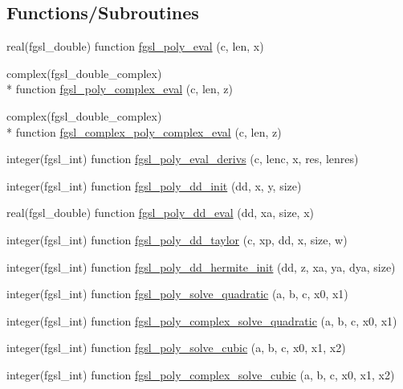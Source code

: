 \subsection*{Functions/\-Subroutines}
\begin{DoxyCompactItemize}
\item 
real(fgsl\-\_\-double) function \hyperlink{poly_8finc_a32cfccd5af1c4b4ce6a1388b521a0e39}{fgsl\-\_\-poly\-\_\-eval} (c, len, x)
\item 
complex(fgsl\-\_\-double\-\_\-complex) \\*
function \hyperlink{poly_8finc_a1e0f019e7c97edb4e583364364479259}{fgsl\-\_\-poly\-\_\-complex\-\_\-eval} (c, len, z)
\item 
complex(fgsl\-\_\-double\-\_\-complex) \\*
function \hyperlink{poly_8finc_a5b484057f9e034d5b22a61812027ef71}{fgsl\-\_\-complex\-\_\-poly\-\_\-complex\-\_\-eval} (c, len, z)
\item 
integer(fgsl\-\_\-int) function \hyperlink{poly_8finc_aab1c2603aacb50d82b93adcd88cbb307}{fgsl\-\_\-poly\-\_\-eval\-\_\-derivs} (c, lenc, x, res, lenres)
\item 
integer(fgsl\-\_\-int) function \hyperlink{poly_8finc_a76d3df1330a37af57601ec4480061f52}{fgsl\-\_\-poly\-\_\-dd\-\_\-init} (dd, x, y, size)
\item 
real(fgsl\-\_\-double) function \hyperlink{poly_8finc_ab036239b25d0a9bd95ac747d71c48b8b}{fgsl\-\_\-poly\-\_\-dd\-\_\-eval} (dd, xa, size, x)
\item 
integer(fgsl\-\_\-int) function \hyperlink{poly_8finc_ab629459414b3347907c9a0559b75bf64}{fgsl\-\_\-poly\-\_\-dd\-\_\-taylor} (c, xp, dd, x, size, w)
\item 
integer(fgsl\-\_\-int) function \hyperlink{poly_8finc_a22ee29152bd09e847e2d85a13ddf08ce}{fgsl\-\_\-poly\-\_\-dd\-\_\-hermite\-\_\-init} (dd, z, xa, ya, dya, size)
\item 
integer(fgsl\-\_\-int) function \hyperlink{poly_8finc_a21062b0907ae31ffc799938513ebae02}{fgsl\-\_\-poly\-\_\-solve\-\_\-quadratic} (a, b, c, x0, x1)
\item 
integer(fgsl\-\_\-int) function \hyperlink{poly_8finc_afe315cb11581a666f03d0c9f2dc78233}{fgsl\-\_\-poly\-\_\-complex\-\_\-solve\-\_\-quadratic} (a, b, c, x0, x1)
\item 
integer(fgsl\-\_\-int) function \hyperlink{poly_8finc_ae68c5a984c47341773668044f141ce19}{fgsl\-\_\-poly\-\_\-solve\-\_\-cubic} (a, b, c, x0, x1, x2)
\item 
integer(fgsl\-\_\-int) function \hyperlink{poly_8finc_a4f38dcb84e7589b62c5419ec6f5816ca}{fgsl\-\_\-poly\-\_\-complex\-\_\-solve\-\_\-cubic} (a, b, c, x0, x1, x2)

\end{DoxyCompactItemize}
